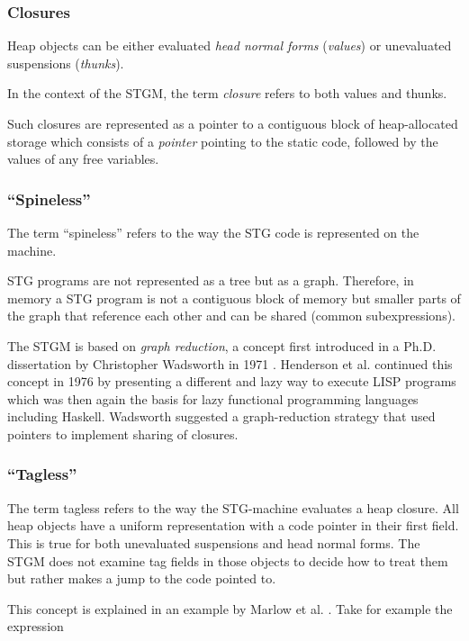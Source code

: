 \documentclass[runningheads]{llncs}
\begin{document}
\cite{jones1992implementing}

\subsubsection{Closures}
Heap objects can be either evaluated \textit{head normal forms} (\textit{values}) or unevaluated suspensions (\textit{thunks}).

In the context of the STGM, the term \textit{closure} refers to both values and thunks.

Such closures are represented as a pointer to a contiguous block of heap-allocated storage which consists of a \textit{pointer} pointing to the static code, followed by the values of any free variables.


\subsubsection{\enquote{Spineless}}
The term \enquote{spineless} refers to the way the STG code is represented on the machine. 

STG programs are not represented as a tree but as a graph. Therefore, in memory a STG program is not a contiguous block of memory but smaller parts of the graph that reference each other and can be shared (common subexpressions).

The STGM is based on \textit{graph reduction}, a concept first introduced in a Ph.D. dissertation by Christopher Wadsworth in 1971 \cite{christopherwadsworth}. Henderson et al. continued this concept in 1976 by presenting a different and lazy way to execute LISP programs \cite{henderson1976lazy} which was then again the basis for lazy functional programming languages including Haskell. Wadsworth suggested a graph-reduction strategy that used pointers to implement sharing of closures.

\subsubsection{\enquote{Tagless}}
The term tagless refers to the way the STG-machine evaluates a heap closure.
All heap objects have a uniform representation with a code pointer in their first field. This is true for both unevaluated suspensions and head normal forms. The STGM does not examine tag fields in those objects to decide how to treat them but rather makes a jump to the code pointed to. \cite{jones1992implementing}

This concept is explained in an example by Marlow et al. \cite{marlow2007faster}. Take for example the expression
\end{document}
